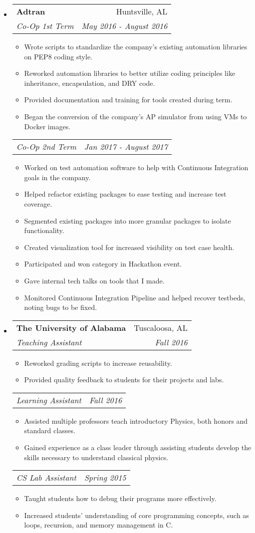 \documentclass[letterpaper,10pt]{article}
\makeatletter
\newcommand{\resitem}[1]{\item #1 \vspace{-2pt}}
\newcommand{\ressubheading}[4]{
    \begin{tabular*}{6.5in}{l@{\cftdotfill{\cftsecdotsep}\extracolsep{\fill}}r}
      \textbf{#1} & #2 \\
      \textit{#3} & \textit{#4} \\
  \end{tabular*}\vspace{-6pt}}
\newcommand{\secondsubheading}[2]{
    \begin{tabular*}{6.5in}{l@{\cftdotfill{\cftsecdotsep}\extracolsep{\fill}}r}
      \textit{#1} & \textit{#2} \\
  \end{tabular*}\vspace{-6pt}}
\makeatother
\begin{document}

  \begin{itemize}

    \item
      \ressubheading{Adtran}{Huntsville, AL}{Co-Op 1st Term}{May 2016 - August 2016}
      \begin{itemize}
          \resitem{Wrote scripts to standardize the company's existing automation libraries on PEP8 coding style.}
          \resitem{Reworked automation libraries to better utilize coding principles like inheritance, encapsulation, and DRY code.}
          \resitem{Provided documentation and training for tools created during term.}
          \resitem{Began the conversion of the company's AP simulator from using VMs to Docker images.}
      \end{itemize}
      \secondsubheading{Co-Op 2nd Term}{Jan 2017 - August 2017}
      \begin{itemize}
              \resitem{Worked on test automation software to help with Continuous Integration goals in the company.}
              \resitem{Helped refactor existing packages to ease testing and increase test coverage.}
              \resitem{Segmented existing packages into more granular packages to isolate functionality.}
              \resitem{Created visualization tool for increased visibility on test case health.}
              \resitem{Participated and won category in Hackathon event.}
              \resitem{Gave internal tech talks on tools that I made.}
              \resitem{Monitored Continuous Integration Pipeline and helped recover testbeds, noting bugs to be fixed.}
      \end{itemize}

    \item
      \ressubheading{The University of Alabama}{Tuscaloosa, AL}{Teaching Assistant}{Fall 2016}
      \begin{itemize}
          \resitem{Reworked grading scripts to increase reusability.}
          \resitem{Provided quality feedback to students for their projects and labs.}
      \end{itemize}

      \secondsubheading{Learning Assistant}{Fall 2016}
      \begin{itemize}
          \resitem{Assisted multiple professors teach introductory Physics, both honors and standard classes.}
          \resitem{Gained experience as a class leader through assisting students develop the skills necessary to understand classical physics.}
      \end{itemize}

      \secondsubheading{CS Lab Assistant}{Spring 2015}
      \begin{itemize}
          \resitem{Taught students how to debug their programs more effectively.}
          \resitem{Increased students' understanding of core programming concepts, such as loops, recursion, and memory management in C.}
      \end{itemize}

  \end{itemize}
\end{document}
